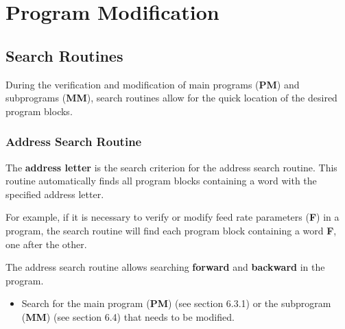 \chapter{Program Modification}

\section{Search Routines}

During the verification and modification of main programs (\textbf{PM}) and subprograms (\textbf{MM}), search routines allow for the quick location of the desired program blocks.

\subsection{Address Search Routine}

The \textbf{address letter} is the search criterion for the address search routine. This routine automatically finds all program blocks containing a word with the specified address letter.

For example, if it is necessary to verify or modify feed rate parameters (\textbf{F}) in a program, the search routine will find each program block containing a word \textbf{F}, one after the other.

The address search routine allows searching \textbf{forward} and \textbf{backward} in the program.

\procedure

\begin{itemize}
    \item Search for the main program (\textbf{PM}) (see section 6.3.1) or the subprogram (\textbf{MM}) (see section 6.4) that needs to be modified.
\end{itemize}

\begin{itemize}
\end{itemize}

\vspace{.5cm}

\begin{itemize}
\end{itemize}

\vspace{.5cm}


